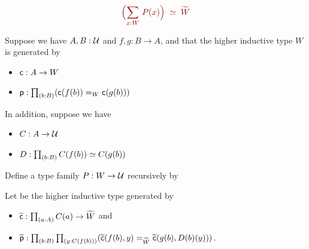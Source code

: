 \documentclass[centering]{report}
\newenvironment{slide}
    {\newpage
    \vspace*{\fill}
    }
    { 
     \vspace*{\fill}
    }
\begin{document}
\begin{slide}
\begin{lem}
\label{thm:flattening-lem}
\begin{align*}
  \color{darkred}
  \eqvspaced{\Parens{\sm{x:W} P(x)}}{\widetilde{W}}
\end{align*}

Suppose we have $A,B:\mathcal{U}$ and $f,g:B\to{}A$, and that
the higher inductive type $W$ is generated by

\begin{itemize}
\item $\mathsf{c}:A\to{}W$ %
\item $\pp:\prd{b:B} (\cc(f(b))=_W\cc(g(b)))$
\end{itemize}
In addition, suppose we have
\begin{itemize}
\item $C:A\to\mathcal{U}$ %
\item $D:\prd{b:B}\eqv{C(f(b))}{C(g(b))}$ %
\end{itemize}
Define a type family $P : W\to\mathcal{U}$ recursively by
Let \Wtil be the higher inductive type generated by
\begin{itemize}
\item $\cct:\prd{a:A} C(a) \to \Wtil$ and
\item $\ppt:\prd{b:B}{y:C(f(b))} (\cct(f(b),y)=_{\Wtil}\cct(g(b),D(b)(y)))$.
\end{itemize}
\end{lem}
\end{slide}
\end{document}
